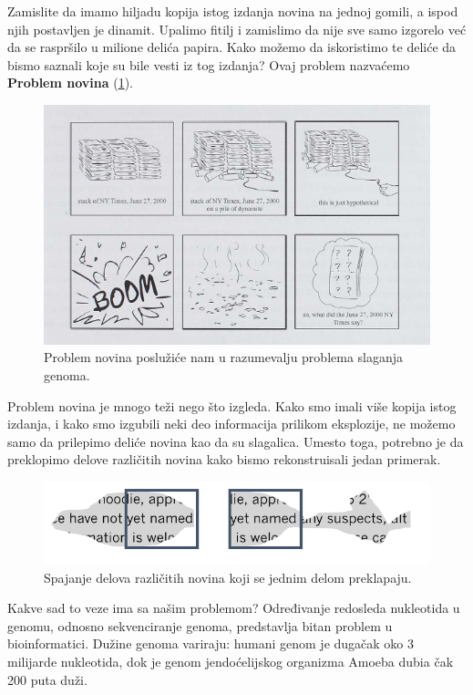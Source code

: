Zamislite da imamo hiljadu kopija istog izdanja novina na jednoj gomili, a ispod njih postavljen je dinamit. Upalimo fitilj i zamislimo da nije sve samo izgorelo već da se raspršilo u milione delića papira. Kako možemo da iskoristimo te deliće da bismo saznali koje su bile vesti iz tog izdanja? Ovaj problem nazvaćemo \textbf{Problem novina} (\ref{slika:eksplozija}). 

\begin{figure}[H]
	\centering
	\includegraphics[width=1\textwidth]{poglavlja/3/slike/eksplozija.png}
	\caption{Problem novina poslužiće nam u razumevalju problema slaganja genoma.}
	\label{slika:eksplozija}
\end{figure} 


Problem novina je mnogo teži nego što izgleda. Kako smo imali više kopija istog izdanja, i kako smo izgubili neki deo informacija prilikom eksplozije, ne možemo samo da prilepimo deliće novina kao da su slagalica. Umesto toga, potrebno je da preklopimo delove različitih novina kako bismo rekonstruisali jedan primerak.


\begin{figure}[H]
	\centering
	\includegraphics[width=1\textwidth]{poglavlja/3/slike/delici.png}
	\caption{Spajanje delova različitih novina koji se jednim delom preklapaju.}
	\label{slika:delici}
\end{figure} 


Kakve sad to veze ima sa našim problemom? Određivanje redosleda nukleotida u genomu, odnosno sekvenciranje genoma, predstavlja bitan problem u bioinformatici. Dužine genoma variraju: humani genom je dugačak oko 3 milijarde nukleotida, dok je genom jendoćelijskog organizma Amoeba dubia čak 200 puta duži. 


